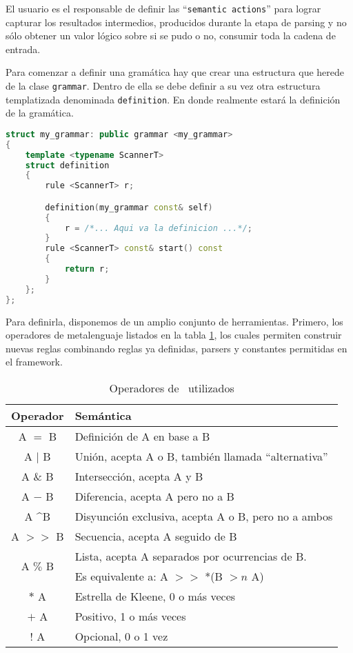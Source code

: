 El usuario es el responsable de definir las ``\texttt{semantic actions}'' para lograr capturar los resultados intermedios, producidos durante la etapa de parsing y no sólo obtener un valor lógico sobre si se pudo o no, consumir toda la cadena de entrada.

Para comenzar a definir una gramática hay que crear una estructura que herede de la clase \texttt{grammar}. Dentro de ella se debe definir a su vez otra estructura templatizada denominada \texttt{definition}. En donde realmente estará la definición de la gramática.


\begin{lstlisting}[float, language=C++, basicstyle=\scriptsize, columns=fullflexible, linewidth=8cm]
struct my_grammar: public grammar <my_grammar>
{
    template <typename ScannerT>
    struct definition
    {
        rule <ScannerT> r;

        definition(my_grammar const& self)
        {
            r = /*... Aqui va la definicion ...*/;
        }
        rule <ScannerT> const& start() const
        {
            return r;
        }
    };
};
\end{lstlisting}

Para definirla, disponemos de un amplio conjunto de herramientas. Primero, los operadores de metalenguaje listados en la tabla \ref{ope_spirit}, los cuales permiten construir nuevas reglas combinando reglas ya definidas, parsers y constantes permitidas en el framework.

\begin{table}[!ht]\centering\scriptsize
\begin{tabular}{| c | p{7cm} |}
\hline

\rowcolor{gris} \textbf{Operador} & \textbf{Semántica} \\ \hline

A $=$                  B  & Definición de A en base a B \\ \hline
A $|$                  B  & Unión, acepta A o B, también llamada ``alternativa''\\ \hline
A $\&$                 B  & Intersección, acepta A y B \\ \hline
A $-$                  B  & Diferencia, acepta A pero no a B  \\ \hline
A \textasciicircum     B  & Disyunción exclusiva, acepta A o B, pero no a ambos \\ \hline
A $>>$                 B  & Secuencia, acepta A seguido de B \\ \hline
\multirow{2}{*}{A $\%$ B} & Lista, acepta A separados por ocurrencias de B.\\
                          & Es equivalente a: A $>>$ *(B $>n$ A)\\ \hline
$*$                    A  & Estrella de Kleene, 0 o más veces \\ \hline
$+$                    A  & Positivo, 1 o más veces \\ \hline
$!$                    A  & Opcional, 0 o 1 vez \\ \hline
\end{tabular}
\caption{Operadores de \spirit\ utilizados}\label{ope_spirit}
\end{table}

